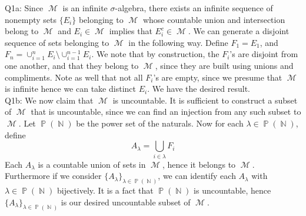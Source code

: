 \documentclass[letterpaper]{article}
\DeclareMathOperator{\M}{\mathcal{M}}
\DeclareMathOperator{\Prt}{\mathbb{P}}
\DeclareMathOperator{\N}{\mathbb{N}}
\begin{document}
\noindent
Q1a: Since $\M$ is an infinite $\sigma$-algebra, there exists an infinite sequence of nonempty sets $\{ E_i\}$ belonging to $\M$ whose countable union and intersection belong to $\M$ and $E_i\in \M $ implies that $E_i^c \in \M$. We can generate a disjoint sequence of sets belonging to $\M$ in the following way. Define $F_1 = E_1$, and $F_n = \cup_{i=1}^n E_i \setminus \cup_{i=1}^{n-1} E_i $. We note that by construction, the $F_i$'s are disjoint from one another, and that they belong to $\M$, since they are built using unions and compliments. Note as well that not all $F_i$'s are empty, since we presume that $\M$ is infinite hence we can take distinct $E_i$. We have the desired result.
\newline \\ Q1b: We now claim that $\M$ is uncountable. It is sufficient to construct a subset of $\M$ that is uncountable, since we can find an injection from any such subset to $\M$. Let $\Prt(\N)$ be the power set of the naturals. Now  for each $\lambda\in \Prt(\N)$, define 
$$A_{\lambda} = \bigcup_{i\in \lambda} F_i$$
Each $A_\lambda$ is a countable union of sets in $\M$, hence it belongs to $\M$. Furthermore if we consider $\{A_\lambda\}_{\lambda \in \Prt(\N)}$, we can identify each $A_\lambda$ with $\lambda\in \Prt(\N)$ bijectively. It is a fact that $\Prt(\N)$ is uncountable, hence $\{A_\lambda \}_{\lambda \in \Prt(\N)}$ is our desired uncountable subset of $\M$. 
\end{document}
